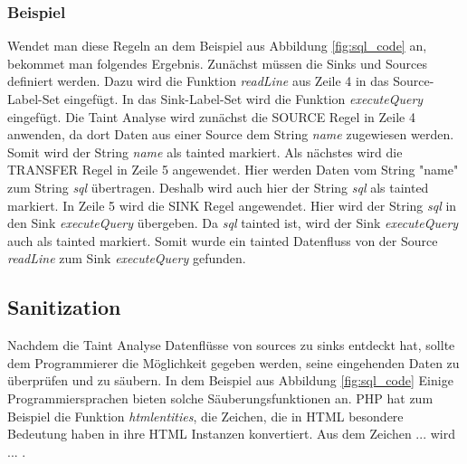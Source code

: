 \documentclass[runningheads]{llncs}
\begin{document}
\subsubsection{Beispiel}
Wendet man diese Regeln an dem Beispiel aus Abbildung \ref{fig:sql_code} an, bekommet man folgendes Ergebnis. Zunächst müssen die Sinks und Sources definiert werden. Dazu wird die Funktion \emph{readLine} aus Zeile 4 in das Source-Label-Set eingefügt. In das Sink-Label-Set wird die Funktion \emph{executeQuery} eingefügt. Die Taint Analyse wird zunächst die SOURCE Regel in Zeile 4 anwenden, da dort Daten aus einer Source dem String \emph{name} zugewiesen werden. Somit wird der String \emph{name} als tainted markiert. Als nächstes wird die TRANSFER Regel in Zeile 5 angewendet. Hier werden Daten vom String "name" zum String \emph{sql} übertragen. Deshalb wird auch hier der String \emph{sql} als tainted markiert. In Zeile 5 wird die SINK Regel angewendet. Hier wird der String \emph{sql} in den Sink \emph{executeQuery} übergeben. Da \emph{sql} tainted ist, wird der Sink \emph{executeQuery} auch als tainted markiert. Somit wurde ein tainted Datenfluss von der Source \emph{readLine} zum Sink \emph{executeQuery} gefunden.

\subsection{Sanitization}
Nachdem die Taint Analyse Datenflüsse von sources zu sinks entdeckt hat, sollte dem Programmierer die Möglichkeit gegeben werden, seine eingehenden Daten zu überprüfen und zu säubern. In dem Beispiel aus Abbildung \ref{fig:sql_code} Einige Programmiersprachen bieten solche Säuberungsfunktionen an. PHP hat zum Beispiel die Funktion \emph{htmlentities}, die Zeichen, die in HTML besondere Bedeutung haben in ihre HTML Instanzen konvertiert. Aus dem Zeichen ... wird ... .
%


\end{document}

